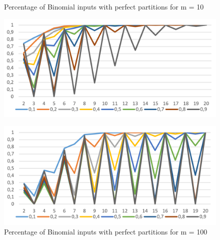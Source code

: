 \begin{figure}[h]
      \centering
      \begin{minipage}[b]{0.45\textwidth}
            \caption{Percentage of Binomial inputs with perfect partitions for m = 10}
            \includegraphics[width=\textwidth]{figures/images/solvabilityOfInputs/binomial_Input_Solvable_m10.png}\label{fig:firstBinPercentage}
      \end{minipage}
      \hspace{0.75cm}
      \begin{minipage}[b]{0.45\textwidth}
            \caption{Percentage of Binomial inputs with perfect partitions for m = 100}
            \includegraphics[width=\textwidth]{figures/images/solvabilityOfInputs/binomial_Input_Solvable_m100.png}
      \end{minipage}
\end{figure}

